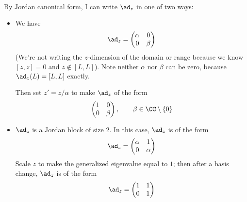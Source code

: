 \documentclass[11pt, headheight=30pt]{scrartcl}
\begin{document}
By Jordan canonical form, I can write $\ad_z$ in one of two ways:
\begin{itemize}
    \item We have
    \[
        \ad_z = \begin{pmatrix}
            \alpha & 0 \\
            0 & \beta
        \end{pmatrix}    
    \]
    (We're not writing the $z$-dimension of the domain or range because
    we know $[z,z] = 0$ and $z\notin [L,L]$). Note neither $\alpha$
    nor $\beta$ can be zero, because $\ad_z(L) = [L,L]$ exactly.

    Then set $z' = z/\alpha$ to make $\ad_z$
    of the form
    \[
        \begin{pmatrix}
            1 & 0 \\
            0 & \beta
        \end{pmatrix},\qquad \beta \in \CC\setminus \{0\}    
    \]
    \item $\ad_z$ is a Jordan block of size $2$.
    In this case, $\ad_z$ is of the form
    \[
        \ad_z = \begin{pmatrix}
            \alpha & 1 \\
            0 & \alpha
        \end{pmatrix}
    \]
    Scale $z$ to make the generalized eigenvalue equal
    to $1$; then after a basis change, $\ad_z$ is of the form
    \[
        \ad_z = \begin{pmatrix}
            1 & 1 \\
            0 & 1
        \end{pmatrix}
    \]
\end{itemize}

\begin{rcase*}
\end{rcase*}
\end{document}
